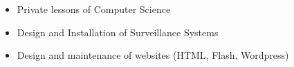 %
%
%

\twocolumnsection
{ 
\vspace{0.5em}
\begin{itemize}
  \item Private lessons of Computer Science
  \item Design and Installation of Surveillance Systems
  \item Design and maintenance of websites (HTML, Flash, Wordpress)
\end{itemize}
}
{ 
\begin{skills}
\end{skills}
}
